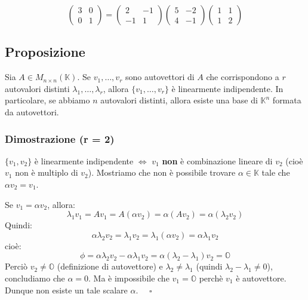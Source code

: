 \documentclass[a4paper]{article}
\theoremstyle{break}
\theoremstyle{break}
\theoremstyle{break}
\theoremstyle{break}
\begin{document}
\begin{example}
  \[
  \begin{pmatrix} 
    3 & 0\\
    0 & 1
  \end{pmatrix} 
  =
  \begin{pmatrix} 
    2 & -1\\
    -1 & 1
  \end{pmatrix} 
  \begin{pmatrix} 
    5 & -2\\
    4 & -1
  \end{pmatrix} 
  \begin{pmatrix} 
    1 & 1\\
    1 & 2
  \end{pmatrix} 
  \] 
\end{example}

\subsection{Proposizione}
Sia \( A \in M_{n \times n}(\mathbb{K}) \). Se \( v_1, \ldots, v_r \) sono autovettori
di \( A \) che corrispondono a \( r \) autovalori distinti \( \lambda_1, \ldots, \lambda_r \),
allora \( \{v_1, \ldots, v_r\}  \) è linearmente indipendente. In particolare,
se abbiamo \( n \) autovalori distinti, allora esiste una base di \( \mathbb{K}^n \) 
formata da autovettori.

\subsubsection{Dimostrazione (r = 2)}
\( \{v_1,v_2\}  \) è linearmente indipendente \( \iff \) \( v_1 \) \textbf{non} è
combinazione lineare di \( v_2 \) (cioè \( v_1 \) non è multiplo di \( v_2 \)). Mostriamo
che non è possibile trovare \( \alpha \in \mathbb{K} \) tale che \( \alpha v_2 = v_1 \).

\vspace{1em}
\noindent Se \( v_1 = \alpha v_2 \), allora:
\[
\lambda_1 v_1 = Av_1 = A(\alpha v_2) = \alpha(A v_2) = \alpha(\lambda_2 v_2)
\] 
Quindi:
\[
\alpha \lambda_2 v_2 = \lambda_1 v_2 = \lambda_1 (\alpha v_2) = \alpha \lambda_1 v_2
\] 
cioè:
\[
\phi = \alpha \lambda_2 v_2 - \alpha \lambda_1 v_2 = \alpha(\lambda_2 - \lambda_1) v_2 = \mathbb{O}
\] 
Perciò \( v_2 \neq \mathbb{O} \) (definizione di autovettore) e \( \lambda_2 \neq \lambda_1 \) 
(quindi \( \lambda_2 - \lambda_1 \neq 0 \)), concludiamo che \( \alpha=0 \). Ma
è impossibile che \( v_1 = \mathbb{O} \) perchè \( v_1 \) è autovettore.
Dunque non esiste un tale scalare \( \alpha \). \( \quad \square \) 
\end{document}
